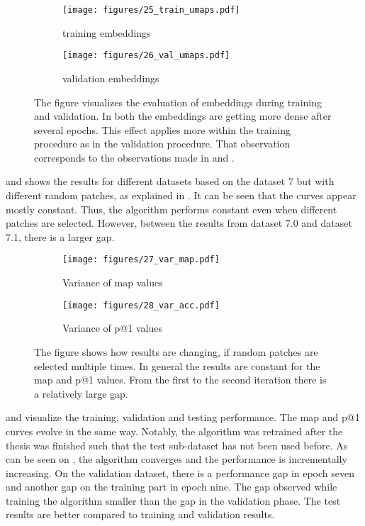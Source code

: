 \begin{figure}
	\centering
	\begin{subfigure}{.5\textwidth}
		\texttt{[image: figures/25\_train\_umaps.pdf]}
		\caption{training embeddings}
		\label{fig:umap_train}
	\end{subfigure}%
	\begin{subfigure}{.5\textwidth}
		\centering
		\texttt{[image: figures/26\_val\_umaps.pdf]}
		\caption{validation embeddings}
		\label{fig:umap_val}
	\end{subfigure}
	\caption{The figure visualizes the evaluation of embeddings during training and validation. In both the embeddings are getting more dense after several epochs. This effect applies more within the training procedure as in the validation procedure. That observation corresponds to the observations made in  and .}
	\label{fig:umap}
\end{figure}
%
\noindent {} and  shows the results for different datasets based on the dataset 7 but with different random patches, as explained in . It can be seen that the curves appear mostly constant. Thus, the algorithm performs constant even when different patches are selected. However, between the results from dataset 7.0 and dataset 7.1, there is a larger gap.
%
\begin{figure}
	\centering
	\begin{subfigure}{.5\textwidth}
		\centering
		\texttt{[image: figures/27\_var\_map.pdf]}
		\caption{Variance of \ac{map} values}
		\label{fig:var_map}
	\end{subfigure}%
	\begin{subfigure}{.5\textwidth}
		\texttt{[image: figures/28\_var\_acc.pdf]}
		\caption{Variance of \ac{p@1} values}
		\label{fig:var_acc}
	\end{subfigure}
	\caption{The figure shows how results are changing, if random patches are selected multiple times. In general the results are constant for the \ac{map} and \ac{p@1} values. From the first to the second iteration there is a relatively large gap.}
	\label{fig:var}
\end{figure}
%
\noindent {} and  visualize the training, validation and testing performance. The \ac{map} and \ac{p@1} curves evolve in the same way. Notably, the algorithm was retrained after the thesis was finished such that the test sub-dataset has not been used before. As can be seen on  , the algorithm converges and the performance is incrementally increasing. On the validation dataset, there is a performance gap in epoch seven and another gap on the training part in epoch nine. The gap observed while training the algorithm smaller than the gap in the validation phase. The test results are better compared to training and validation results.
